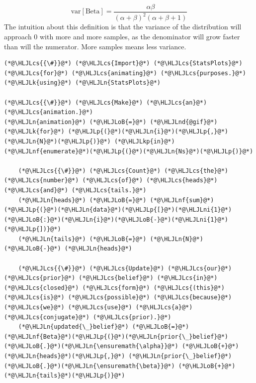 \documentclass[12pt,a4paper]{article}
\newcommand{\HLJLk}[1]{\textcolor[RGB]{148,91,176}{\textbf{#1}}}
\newcommand{\HLJLkp}[1]{\textcolor[RGB]{148,91,176}{\textbf{#1}}}
\newcommand{\HLJLn}[1]{#1}
\newcommand{\HLJLnd}[1]{\textcolor[RGB]{214,102,97}{#1}}
\newcommand{\HLJLnf}[1]{\textcolor[RGB]{66,102,213}{#1}}
\newcommand{\HLJLni}[1]{\textcolor[RGB]{59,151,46}{#1}}
\newcommand{\HLJLoB}[1]{\textcolor[RGB]{102,102,102}{\textbf{#1}}}
\newcommand{\HLJLp}[1]{#1}
\newcommand{\HLJLcs}[1]{\textcolor[RGB]{153,153,119}{\textit{#1}}}
\begin{document}
\[
\text{var}[\text{Beta}] = \dfrac{\alpha\beta}{(\alpha + \beta)^2 (\alpha + \beta + 1)}
\]
The intuition about this definition is that the variance of the distribution will approach 0 with more and more samples, as the denominator will grow faster than will the numerator. More samples means less variance.


\begin{lstlisting}
(*@\HLJLcs{{\#}}@*) (*@\HLJLcs{Import}@*) (*@\HLJLcs{StatsPlots}@*) (*@\HLJLcs{for}@*) (*@\HLJLcs{animating}@*) (*@\HLJLcs{purposes.}@*)
(*@\HLJLk{using}@*) (*@\HLJLn{StatsPlots}@*)

(*@\HLJLcs{{\#}}@*) (*@\HLJLcs{Make}@*) (*@\HLJLcs{an}@*) (*@\HLJLcs{animation.}@*)
(*@\HLJLn{animation}@*) (*@\HLJLoB{=}@*) (*@\HLJLnd{@gif}@*) (*@\HLJLk{for}@*) (*@\HLJLp{(}@*)(*@\HLJLn{i}@*)(*@\HLJLp{,}@*) (*@\HLJLn{N}@*)(*@\HLJLp{)}@*) (*@\HLJLkp{in}@*) (*@\HLJLnf{enumerate}@*)(*@\HLJLp{(}@*)(*@\HLJLn{Ns}@*)(*@\HLJLp{)}@*)

    (*@\HLJLcs{{\#}}@*) (*@\HLJLcs{Count}@*) (*@\HLJLcs{the}@*) (*@\HLJLcs{number}@*) (*@\HLJLcs{of}@*) (*@\HLJLcs{heads}@*) (*@\HLJLcs{and}@*) (*@\HLJLcs{tails.}@*)
    (*@\HLJLn{heads}@*) (*@\HLJLoB{=}@*) (*@\HLJLnf{sum}@*)(*@\HLJLp{(}@*)(*@\HLJLn{data}@*)(*@\HLJLp{[}@*)(*@\HLJLni{1}@*)(*@\HLJLoB{:}@*)(*@\HLJLn{i}@*)(*@\HLJLoB{-}@*)(*@\HLJLni{1}@*)(*@\HLJLp{])}@*)
    (*@\HLJLn{tails}@*) (*@\HLJLoB{=}@*) (*@\HLJLn{N}@*) (*@\HLJLoB{-}@*) (*@\HLJLn{heads}@*)
    
    (*@\HLJLcs{{\#}}@*) (*@\HLJLcs{Update}@*) (*@\HLJLcs{our}@*) (*@\HLJLcs{prior}@*) (*@\HLJLcs{belief}@*) (*@\HLJLcs{in}@*) (*@\HLJLcs{closed}@*) (*@\HLJLcs{form}@*) (*@\HLJLcs{(this}@*) (*@\HLJLcs{is}@*) (*@\HLJLcs{possible}@*) (*@\HLJLcs{because}@*) (*@\HLJLcs{we}@*) (*@\HLJLcs{use}@*) (*@\HLJLcs{a}@*) (*@\HLJLcs{conjugate}@*) (*@\HLJLcs{prior).}@*)
    (*@\HLJLn{updated{\_}belief}@*) (*@\HLJLoB{=}@*) (*@\HLJLnf{Beta}@*)(*@\HLJLp{(}@*)(*@\HLJLn{prior{\_}belief}@*)(*@\HLJLoB{.}@*)(*@\HLJLn{\ensuremath{\alpha}}@*) (*@\HLJLoB{+}@*) (*@\HLJLn{heads}@*)(*@\HLJLp{,}@*) (*@\HLJLn{prior{\_}belief}@*)(*@\HLJLoB{.}@*)(*@\HLJLn{\ensuremath{\beta}}@*) (*@\HLJLoB{+}@*) (*@\HLJLn{tails}@*)(*@\HLJLp{)}@*)


\end{lstlisting}
\end{document}

